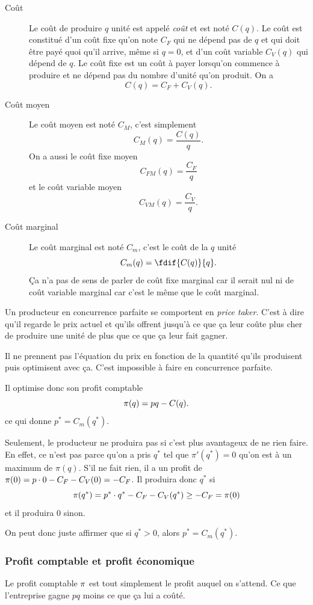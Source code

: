 \begin{description}
  \item[Coût]
    Le coût de produire $q$ unité est appelé \emph{coût} et est noté $C(q)$.
    Le coût est constitué d'un coût fixe qu'on note $C_F$ qui ne dépend
    pas de $q$ et qui doit être payé quoi qu'il arrive,
    même si $q = 0$, et d'un coût
    variable $C_V(q)$ qui dépend de $q$.
    Le coût fixe est un coût à payer lorsqu'on commence à produire
    et ne dépend pas du nombre d'unité qu'on produit. On a
    \[ C(q) = C_F + C_V(q). \]
  \item[Coût moyen]
    Le coût moyen est noté $C_M$, c'est simplement
    \[ C_M(q) = \frac{C(q)}{q}. \]
    On a aussi le coût fixe moyen
    \[ C_{FM}(q) = \frac{C_F}{q} \]
    et le coût variable moyen
    \[ C_{VM}(q) = \frac{C_V}{q}. \]
  \item[Coût marginal]
    Le coût marginal est noté $C_m$, c'est le coût de la $q$\ieme{} unité
    \[ C_m(q) = \fdif{C(q)}{q}. \]
    Ça n'a pas de sens de parler de coût fixe marginal car il serait nul
    ni de coût variable marginal car c'est le même que le coût marginal.
\end{description}

Un producteur en concurrence parfaite se comportent en \emph{price taker}.
C'est à dire qu'il regarde le prix actuel et qu'ils offrent jusqu'à
ce que ça leur coûte plus cher de produire une unité de plus que ce que
ça leur fait gagner.

Il ne prennent pas l'équation du prix en fonction de la quantité
qu'ils produisent puis optimisent avec ça.
C'est impossible à faire en concurrence parfaite.

Il optimise donc son profit comptable
\[ \pi(q) = pq - C(q). \]
ce qui donne $p^* = C_m(q^*)$.

Seulement, le producteur ne produira pas si c'est plus avantageux de
ne rien faire.
En effet, ce n'est pas parce qu'on a pris $q^*$ tel que $\pi'(q^*) = 0$ qu'on
est à un maximum de $\pi(q)$.
S'il ne fait rien, il a un profit de
$\pi(0) = p \cdot 0 - C_F - C_V(0) = -C_F$.
Il produira donc $q^*$ si
\[ \pi(q^*) = p^* \cdot q^* - C_F - C_V(q^*) \geq -C_F = \pi(0) \]
et il produira 0 sinon.

On peut donc juste affirmer que si $q^* > 0$, alors $p^* = C_m(q^*)$.

\subsubsection{Profit comptable et profit économique}
Le profit comptable $\pi$ est tout simplement le profit auquel on s'attend.
Ce que l'entreprise gagne $pq$ moins ce que ça lui a coûté.

